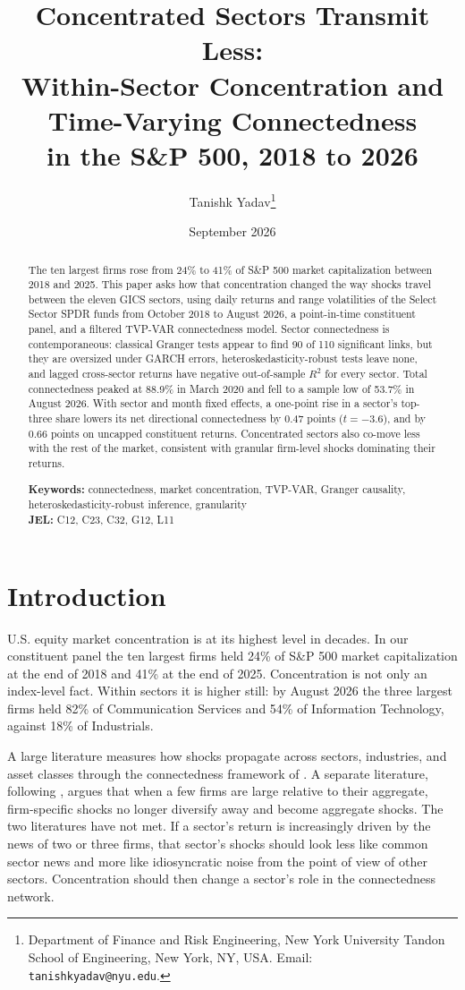 \documentclass[11pt]{article}
\title{Concentrated Sectors Transmit Less:\\Within-Sector Concentration and Time-Varying Connectedness\\in the S\&P 500, 2018 to 2026}
\author{Tanishk Yadav\thanks{Department of Finance and Risk Engineering, New York University Tandon School of Engineering, New York, NY, USA. Email: \texttt{tanishkyadav@nyu.edu}.}}
\date{September 2026}
\begin{document}
\maketitle

\begin{abstract}
\noindent
The ten largest firms rose from 24\% to 41\% of S\&P 500 market capitalization between 2018 and 2025. This paper asks how that concentration changed the way shocks travel between the eleven GICS sectors, using daily returns and range volatilities of the Select Sector SPDR funds from October 2018 to August 2026, a point-in-time constituent panel, and a filtered TVP-VAR connectedness model. Sector connectedness is contemporaneous: classical Granger tests appear to find 90 of 110 significant links, but they are oversized under GARCH errors, heteroskedasticity-robust tests leave none, and lagged cross-sector returns have negative out-of-sample $R^2$ for every sector. Total connectedness peaked at 88.9\% in March 2020 and fell to a sample low of 53.7\% in August 2026. With sector and month fixed effects, a one-point rise in a sector's top-three share lowers its net directional connectedness by 0.47 points ($t=-3.6$), and by 0.66 points on uncapped constituent returns. Concentrated sectors also co-move less with the rest of the market, consistent with granular firm-level shocks dominating their returns.

\medskip
\noindent\textbf{Keywords:} connectedness, market concentration, TVP-VAR, Granger causality, heteroskedasticity-robust inference, granularity
\\\noindent\textbf{JEL:} C12, C23, C32, G12, L11
\end{abstract}

\newpage
\section{Introduction}

U.S. equity market concentration is at its highest level in decades. In our constituent panel the ten largest firms held 24\% of S\&P 500 market capitalization at the end of 2018 and 41\% at the end of 2025. Concentration is not only an index-level fact. Within sectors it is higher still: by August 2026 the three largest firms held 82\% of Communication Services and 54\% of Information Technology, against 18\% of Industrials.

A large literature measures how shocks propagate across sectors, industries, and asset classes through the connectedness framework of \citet{diebold2009, diebold2012, diebold2014}. A separate literature, following \citet{gabaix2011}, argues that when a few firms are large relative to their aggregate, firm-specific shocks no longer diversify away and become aggregate shocks. The two literatures have not met. If a sector's return is increasingly driven by the news of two or three firms, that sector's shocks should look less like common sector news and more like idiosyncratic noise from the point of view of other sectors. Concentration should then change a sector's role in the connectedness network.
\end{document}
